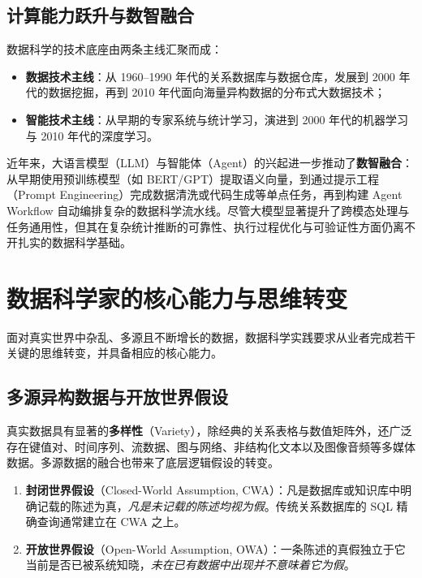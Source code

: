 \subsection{计算能力跃升与数智融合}

数据科学的技术底座由两条主线汇聚而成：
\begin{itemize}
  \item \textbf{数据技术主线}：从 1960–1990 年代的关系数据库与数据仓库，发展到 2000 年代的数据挖掘，再到 2010 年代面向海量异构数据的分布式大数据技术；
  \item \textbf{智能技术主线}：从早期的专家系统与统计学习，演进到 2000 年代的机器学习与 2010 年代的深度学习。
\end{itemize}

近年来，大语言模型（LLM）与智能体（Agent）的兴起进一步推动了\textbf{数智融合}：从早期使用预训练模型（如 BERT/GPT）提取语义向量，到通过提示工程（Prompt Engineering）完成数据清洗或代码生成等单点任务，再到构建 Agent Workflow 自动编排复杂的数据科学流水线。尽管大模型显著提升了跨模态处理与任务通用性，但其在复杂统计推断的可靠性、执行过程优化与可验证性方面仍离不开扎实的数据科学基础。

\section{数据科学家的核心能力与思维转变}\label{sec:ds-skills}

面对真实世界中杂乱、多源且不断增长的数据，数据科学实践要求从业者完成若干关键的思维转变，并具备相应的核心能力。

\subsection{多源异构数据与开放世界假设}

真实数据具有显著的\textbf{多样性}（Variety），除经典的关系表格与数值矩阵外，还广泛存在键值对、时间序列、流数据、图与网络、非结构化文本以及图像音频等多媒体数据。多源数据的融合也带来了底层逻辑假设的转变。

\begin{definition}[封闭世界假设与开放世界假设]\label{def:cwa-owa}
\begin{enumerate}
  \item \textbf{封闭世界假设}（Closed-World Assumption, CWA）：凡是数据库或知识库中明确记载的陈述为真，\emph{凡是未记载的陈述均视为假}。传统关系数据库的 SQL 精确查询通常建立在 CWA 之上。
  \item \textbf{开放世界假设}（Open-World Assumption, OWA）：一条陈述的真假独立于它当前是否已被系统知晓，\emph{未在已有数据中出现并不意味着它为假}。
\end{enumerate}
\end{definition}

